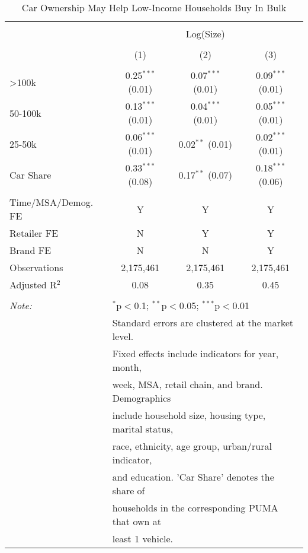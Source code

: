 
\begin{table}[!htbp] \centering 
  \caption{Car Ownership May Help Low-Income Households Buy In Bulk} 
  \label{tab:packageSizeFullTpCar} 
\begin{tabular}{@{\extracolsep{5pt}}lccc} 
\\[-1.8ex]\hline 
\hline \\[-1.8ex] 
 & \multicolumn{3}{c}{Log(Size)} \\ 
\\[-1.8ex] & (1) & (2) & (3)\\ 
\hline \\[-1.8ex] 
 >100k & 0.25$^{***}$ (0.01) & 0.07$^{***}$ (0.01) & 0.09$^{***}$ (0.01) \\ 
  50-100k & 0.13$^{***}$ (0.01) & 0.04$^{***}$ (0.01) & 0.05$^{***}$ (0.01) \\ 
  25-50k & 0.06$^{***}$ (0.01) & 0.02$^{**}$ (0.01) & 0.02$^{***}$ (0.01) \\ 
  Car Share & 0.33$^{***}$ (0.08) & 0.17$^{**}$ (0.07) & 0.18$^{***}$ (0.06) \\ 
 \hline \\[-1.8ex] 
Time/MSA/Demog. FE & Y & Y & Y \\ 
Retailer FE & N & Y & Y \\ 
Brand FE & N & N & Y \\ 
Observations & 2,175,461 & 2,175,461 & 2,175,461 \\ 
Adjusted R$^{2}$ & 0.08 & 0.35 & 0.45 \\ 
\hline 
\hline \\[-1.8ex] 
\textit{Note:}  & \multicolumn{3}{l}{$^{*}$p$<$0.1; $^{**}$p$<$0.05; $^{***}$p$<$0.01} \\ 
 & \multicolumn{3}{l}{Standard errors are clustered at the market level.} \\ 
 & \multicolumn{3}{l}{Fixed effects include indicators for year, month, } \\ 
 & \multicolumn{3}{l}{week, MSA, retail chain, and brand. Demographics } \\ 
 & \multicolumn{3}{l}{include household size, housing type, marital status, } \\ 
 & \multicolumn{3}{l}{race, ethnicity, age group, urban/rural indicator, } \\ 
 & \multicolumn{3}{l}{and education. 'Car Share' denotes the share of } \\ 
 & \multicolumn{3}{l}{households in the corresponding PUMA that own at } \\ 
 & \multicolumn{3}{l}{least 1 vehicle.} \\ 
\end{tabular} 
\end{table} 
